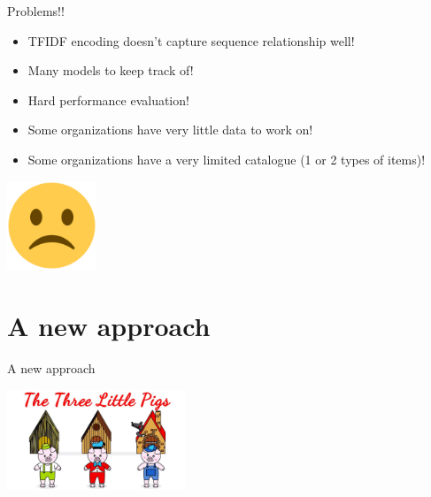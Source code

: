 \documentclass[9pt]{beamer}
\begin{document}
\begin{frame}{Problems!!}
	\begin{itemize}
		\item TFIDF encoding doesn't capture sequence relationship well! %
		\item Many models to keep track of!
		\item Hard performance evaluation!
		\item Some organizations have very little data to work on!
		\item Some organizations have a very limited catalogue (1 or 2 types of items)!
	\end{itemize}

	\pause
	\begin{center}
		\includegraphics[width=0.2\textwidth]{imgs/sad.png}
	\end{center}
\end{frame}


\section{A new approach}
\begin{frame}{A new approach}
	\begin{center}
		\includegraphics[width=0.4\textwidth,height=!,trim={16cm 0 17.5cm 5cm},clip]{imgs/houses.jpg}
	\end{center}
\end{frame}
\end{document}
